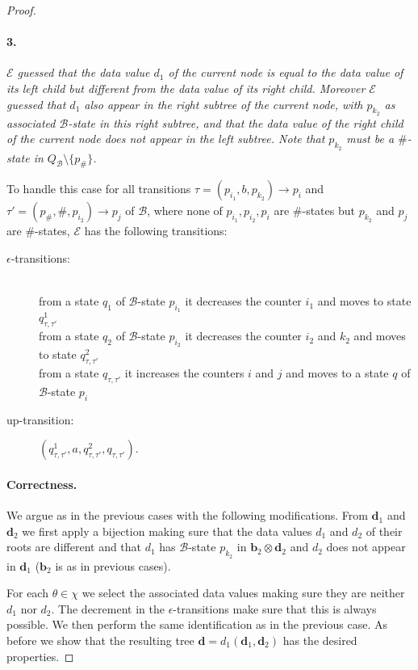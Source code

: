 \documentclass{CSML}
\newcommand\ra{\ensuremath{\rightarrow}}
\newcommand\Ba{\mathcal{B}}
\newcommand\Ea{\mathcal{E}}
\newcommand\btree{\boldsymbol{b}}
\newcommand\dtree{\boldsymbol{d}}
\begin{document}
\begin{proof}
 
\paragraph{\bf 3.}  
\emph{$\Ea$ guessed that the data value $d_1$ of the
  current node is equal to the data value of its left child but different
  from the data value of its right child.
  Moreover $\Ea$ guessed that $d_1$ also appear in
  the right subtree of the current node, with $p_{k_2}$ as associated $\Ba$-state in this right subtree, 
  and that the data value of the right child of the current node does not appear in the left subtree. 
  Note that $p_{k_2}$ must be a $\#$-state in $Q_\Ba \setminus \{ p_\#\}$.}

\noindent
To handle this case for all transitions $\tau=(p_{i_1},b,p_{k_2}) \ra p_{i}$
and $\tau'=(p_{\#},\#,p_{i_2})\ra p_j$ of
$\Ba$, where none of $p_{i_1},p_{i_2}, p_i$ are $\#$-states but
$p_{k_2}$ and $p_j$  are $\#$-states, 
$\Ea$ has the following transitions:
\begin{description}
\item[\rm $\epsilon$-transitions:] \quad\\
from a state $q_1$ of $\Ba$-state $p_{i_1}$
it decreases the counter $i_1$ 
and moves to state $q_{\tau,\tau'}^1$\\
from a state $q_2$ of $\Ba$-state $p_{i_2}$ 
it decreases the counter $i_2$ 
and $k_2$ and moves to state $q_{\tau,\tau'}^2$\\
from a state $q_{\tau,\tau'}$ 
it increases the counters $i$ and $j$ 
and moves to a state $q$ of $\Ba$-state $p_i$

\item[\rm up-transition:]
$(q_{\tau,\tau'}^1,a,q_{\tau,\tau'}^2,q_{\tau,\tau'})$.
\end{description}

\paragraph{\bf Correctness.}  
We argue as in the previous cases with the following modifications.
From $\dtree_1$ and $\dtree_2$ we first apply a bijection making sure that the
data values $d_1$ and $d_2$ of their roots are different and that $d_1$ has
$\Ba$-state $p_{k_2}$ in $\btree_2 \otimes \dtree_2$ 
and $d_2$ does not appear in $\dtree_1$ ($\btree_2$ is as in previous cases).

For each $\theta \in \chi$ we select the associated data values making sure
they are neither $d_1$ nor $d_2$. The decrement in the $\epsilon$-transitions make sure
that this is always possible. We then perform the same identification as in the
previous case. 
As before we show that the resulting tree $\dtree=d_1(\dtree_1,\dtree_2)$ has the desired properties.


\end{proof}
\end{document}
